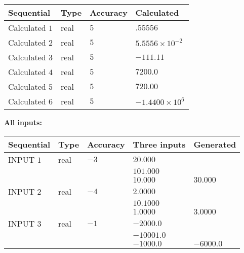 \documentclass[12pt]{article}
\begin{document}
   
  
  
\noindent\begin{tabular}{|l|l|l|l|}
\hline
 Sequential & Type & Accuracy & Calculated \\ 
\hline
 
 
  Calculated $           1$ & real & $           5 $ & 
 $ .55556 $ 
 \\  \hline  
 
 
  Calculated $           2$ & real & $           5 $ & 
 $ 5.5556 \times 10^{-2} $ 
 \\  \hline  
 
 
  Calculated $           3$ & real & $           5 $ & 
 $ -111.11 $ 
 \\  \hline  
 
 
  Calculated $           4$ & real & $           5 $ & 
 $ 7200.0 $ 
 \\  \hline  
 
 
  Calculated $           5$ & real & $           5 $ & 
 $ 720.00 $ 
 \\  \hline  
 
 
  Calculated $           6$ & real & $           5 $ & 
 $ -1.4400 \times 10^{6} $ 
 \\  \hline  
 \end{tabular}
   
   
   
   
\noindent\vspace{0.1in}\hspace{-0.08in} {\textbf{\Large{All inputs: }}}
   
   
  
  
\noindent\begin{tabular}{|l|l|l|l|l|}
\hline
 Sequential & Type & Accuracy & Three inputs & Generated \\ 
\hline
 
 
  INPUT $           1$ & real & $          -3 $ & $
 20.000
  $ & \\
  & & &  $
 101.000
  $ & \\
  & & &  $
 10.000
 $ & $ 30.000 $ 
 \\  \hline  
 
 
  INPUT $           2$ & real & $          -4 $ & $
 2.0000
  $ & \\
  & & &  $
 10.1000
  $ & \\
  & & &  $
 1.0000
 $ & $ 3.0000 $ 
 \\  \hline  
 
 
  INPUT $           3$ & real & $          -1 $ & $
 -2000.0
  $ & \\
  & & &  $
 -10001.0
  $ & \\
  & & &  $
 -1000.0
 $ & $ -6000.0 $ 
 \\  \hline  
 \end{tabular}
   
\end{document}
